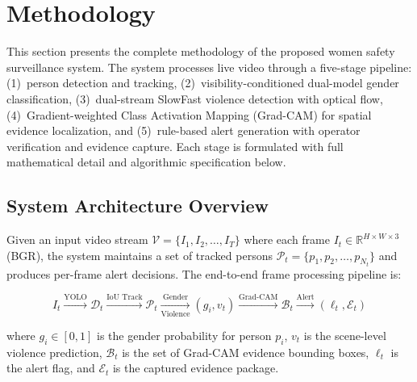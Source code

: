 \documentclass[11pt,a4paper]{article}
\newcommand{\R}{\mathbb{R}}
\begin{document}
\section{Methodology}
\label{sec:methodology}

This section presents the complete methodology of the proposed women safety surveillance system. The system processes live video through a five-stage pipeline: (1)~person detection and tracking, (2)~visibility-conditioned dual-model gender classification, (3)~dual-stream SlowFast violence detection with optical flow, (4)~Gradient-weighted Class Activation Mapping (Grad-CAM) for spatial evidence localization, and (5)~rule-based alert generation with operator verification and evidence capture. Each stage is formulated with full mathematical detail and algorithmic specification below.


\subsection{System Architecture Overview}
\label{subsec:overview}

Given an input video stream $\mathcal{V} = \{I_1, I_2, \ldots, I_T\}$ where each frame $I_t \in \R^{H \times W \times 3}$ (BGR), the system maintains a set of tracked persons $\mathcal{P}_t = \{p_1, p_2, \ldots, p_{N_t}\}$ and produces per-frame alert decisions. The end-to-end frame processing pipeline is:

\begin{equation}
I_t \xrightarrow{\text{YOLO}} \mathcal{D}_t \xrightarrow{\text{IoU Track}} \mathcal{P}_t \xrightarrow[\text{Violence}]{\text{Gender}} (g_i, v_t) \xrightarrow{\text{Grad-CAM}} \mathcal{B}_t \xrightarrow{\text{Alert}} (\ell_t, \mathcal{E}_t)
\label{eq:pipeline}
\end{equation}

\noindent where $g_i \in [0,1]$ is the gender probability for person $p_i$, $v_t$ is the scene-level violence prediction, $\mathcal{B}_t$ is the set of Grad-CAM evidence bounding boxes, $\ell_t$ is the alert flag, and $\mathcal{E}_t$ is the captured evidence package.
\end{document}
